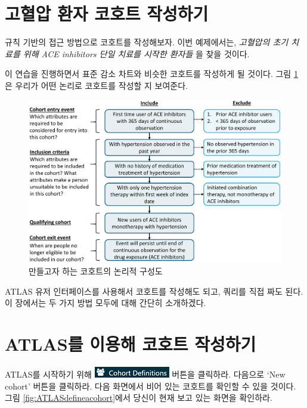 \documentclass[11pt]{book}
\theoremstyle{definition}
\theoremstyle{definition}
\theoremstyle{definition}
\theoremstyle{remark}
\begin{document}
\section{고혈압 환자 코호트 작성하기}\label{---}

규칙 기반의 접근 방법으로 코호트를 작성해보자. 이번 예제에서는,
\emph{고혈압의 초기 치료를 위해 ACE inhibitors 단일 치료를 시작한
환자들} 을 찾을 것이다.

이 연습을 진행하면서 표준 감소 차트와 비슷한 코호트를 작성하게 될
것이다. 그림 \ref{fig:CohortPractice}은 우리가 어떤 논리로 코호트를
작성할 지 보여준다.

\begin{figure}

{\centering \includegraphics[width=1\linewidth]{images/Cohorts/CohortPractice} 

}

\caption{만들고자 하는 코호트의 논리적 구성도}\label{fig:CohortPractice}
\end{figure}

ATLAS 유저 인터페이스를 사용해서 코호트를 작성해도 되고, 쿼리를 직접
짜도 된다. 이 장에서는 두 가지 방법 모두에 대해 간단히 소개하겠다.

\section{ATLAS를 이용해 코호트 작성하기}\label{atlas---}

ATLAS를 시작하기 위해
\includegraphics{images/Cohorts/cohortdefinition.png} 버튼을 클릭하라.
다음으로 `New cohort' 버튼을 클릭하라. 다음 화면에서 비어 있는 코호트를
확인할 수 있을 것이다. 그림 \ref{fig:ATLASdefineacohort}에서 당신이 현재
보고 있는 화면을 확인하라.
\end{document}
